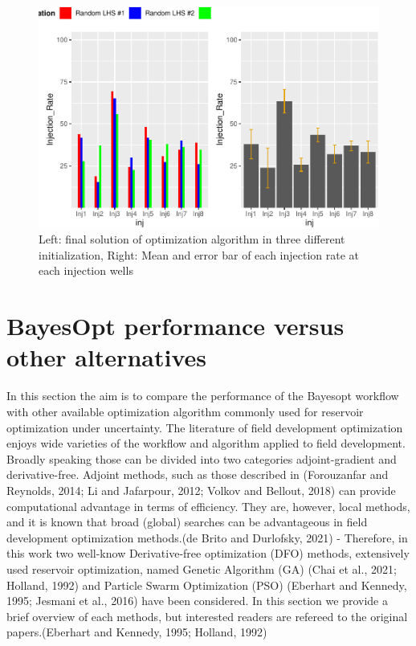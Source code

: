 \documentclass[]{elsarticle} %
\begin{document}
\begin{figure}

{\centering \includegraphics[width=0.9\linewidth]{0_Paper1_main_files/figure-latex/diffu-1} 

}

\caption{Left: final solution of optimization algorithm in three different initialization, Right: Mean and error bar of each injection rate at each injection wells}\label{fig:diffu}
\end{figure}

\newpage

\newpage

\hypertarget{bayesopt-performance-versus-other-alternatives}{%
\section{BayesOpt performance versus other alternatives}\label{bayesopt-performance-versus-other-alternatives}}

In this section the aim is to compare the performance of the Bayesopt workflow with other available optimization algorithm commonly used for reservoir optimization under uncertainty. The literature of field development optimization enjoys wide varieties of the workflow and algorithm applied to field development. Broadly speaking those can be divided into two categories adjoint-gradient and derivative-free. Adjoint methods, such as those described in (Forouzanfar and Reynolds, 2014; Li and Jafarpour, 2012; Volkov and Bellout, 2018) can provide computational advantage in terms of efficiency. They are, however, local methods, and it is known that broad (global) searches can be advantageous in field development optimization methods.(de Brito and Durlofsky, 2021) - Therefore, in this work two well-know Derivative-free optimization (DFO) methods, extensively used reservoir optimization, named Genetic Algorithm (GA) (Chai et al., 2021; Holland, 1992) and Particle Swarm Optimization (PSO) (Eberhart and Kennedy, 1995; Jesmani et al., 2016) have been considered. In this section we provide a brief overview of each methods, but interested readers are refereed to the original papers.(Eberhart and Kennedy, 1995; Holland, 1992)
\end{document}
